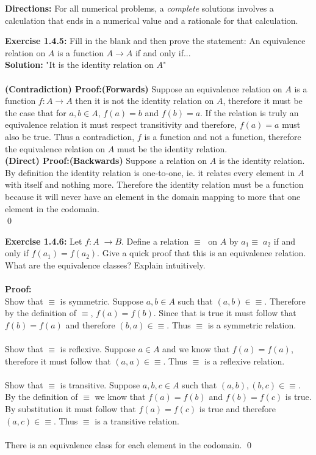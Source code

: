 \documentclass{amsart}
\begin{document}
\thispagestyle{fancy}

\textbf{Directions:} For all numerical problems, a \emph{complete} solutions involves a calculation that ends in a numerical value and a rationale for that calculation.

\noindent\textbf{Exercise 1.4.5: }Fill in the blank and then prove the statement: An equivalence relation on $A$ is a
function $A \to A$ if and only if...\\
\noindent \textbf{Solution:} "It is the identity relation on $A$"\\\\
\noindent \textbf{(Contradiction) Proof:(Forwards)} Suppose an equivalence relation on $A$ is a function $f: A \to A$ then it is not the identity relation on $A$, therefore it must be the case that for $a,b\in A$, $f(a)=b$ and $f(b)=a$. If the relation is truly an equivalence relation it must respect transitivity and therefore, $f(a)=a$ must also be true. Thus a contradiction, $f$ is a function and not a function, therefore the equivalence relation on $A$  must be the identity relation.\\

\noindent \textbf{(Direct) Proof:(Backwards)} Suppose a relation on $A$ is the identity relation. By definition the identity relation is one-to-one, ie. it relates every element in $A$ with itself and nothing more. Therefore the identity relation must be a function because it will never have an element in the domain mapping to more that one element in the codomain.\\ 
\qed



\vspace{1in}


\noindent\textbf{Exercise 1.4.6: } Let $f:A􏰋\to B$. Define a relation $\equiv$ 􏰐on $A$ by $a_1\equiv 􏰐a_2 $ if and only if $f(a_1)=f(a_2)$. Give a quick proof that this is an equivalence relation. What are the equivalence classes? Explain intuitively.\\\\
\noindent \textbf{Proof:}\\
Show that $\equiv$ is symmetric. Suppose $a,b \in A$ such that $(a,b) \in \equiv$. Therefore by the definition of $\equiv$, $f(a)= f(b)$. Since that is true it must follow that $f(b)=f(a)$ and therefore $(b,a) \in \equiv$. Thus $\equiv$ is a symmetric relation. \\\\
 Show that $\equiv$ is reflexive. Suppose $a \in A$ and we know that $f(a)=f(a)$, therefore it must follow that $(a,a) \in \equiv$. Thus $\equiv$ is a reflexive relation.\\\\
 Show that $\equiv$ is transitive. Suppose $a,b,c \in A$ such that $(a,b),(b,c) \in \equiv$. By the definition of $\equiv$ we know that $f(a)=f(b)$ and $f(b)=f(c)$ is true. By substitution it must follow that  $f(a)=f(c)$ is true and therefore $(a,c) \in  \equiv$. Thus $\equiv$ is a transitive relation.\\\\
There is an equivalence class for each element in the codomain.
\qed
\end{document}
